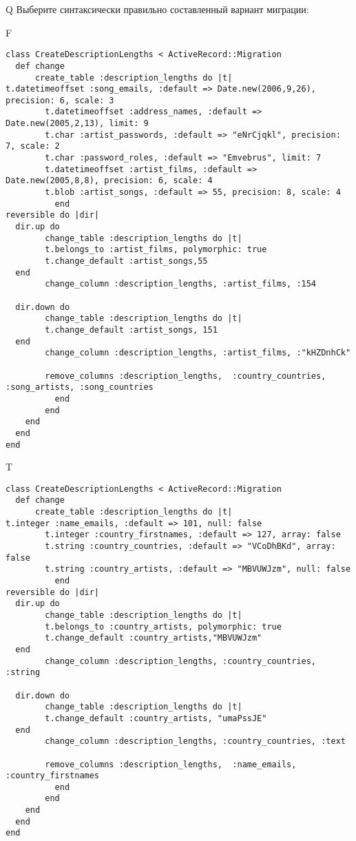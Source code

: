 Q
Выберите синтаксически правильно составленный вариант миграции:

F
\begin{verbatim}
class CreateDescriptionLengths < ActiveRecord::Migration
  def change
	  create_table :description_lengths do |t|
t.datetimeoffset :song_emails, :default => Date.new(2006,9,26), precision: 6, scale: 3
		t.datetimeoffset :address_names, :default => Date.new(2005,2,13), limit: 9
		t.char :artist_passwords, :default => "eNrCjqkl", precision: 7, scale: 2
		t.char :password_roles, :default => "Emvebrus", limit: 7
		t.datetimeoffset :artist_films, :default => Date.new(2005,8,8), precision: 6, scale: 4
		t.blob :artist_songs, :default => 55, precision: 8, scale: 4
		  end
reversible do |dir|
  dir.up do
		change_table :description_lengths do |t|
		t.belongs_to :artist_films, polymorphic: true
 		t.change_default :artist_songs,55
  end
 		change_column :description_lengths, :artist_films, :154
   
  dir.down do
		change_table :description_lengths do |t|
		t.change_default :artist_songs, 151
  end
 		change_column :description_lengths, :artist_films, :"kHZDnhCk"
   
		remove_columns :description_lengths,  :country_countries, :song_artists, :song_countries 
	      end
	    end
    end 
  end
end

\end{verbatim}

T
\begin{verbatim}
class CreateDescriptionLengths < ActiveRecord::Migration
  def change
	  create_table :description_lengths do |t|
t.integer :name_emails, :default => 101, null: false
		t.integer :country_firstnames, :default => 127, array: false
		t.string :country_countries, :default => "VCoDhBKd", array: false
		t.string :country_artists, :default => "MBVUWJzm", null: false
		  end
reversible do |dir|
  dir.up do
		change_table :description_lengths do |t|
		t.belongs_to :country_artists, polymorphic: true
 		t.change_default :country_artists,"MBVUWJzm"
  end
 		change_column :description_lengths, :country_countries, :string
   
  dir.down do
		change_table :description_lengths do |t|
		t.change_default :country_artists, "umaPssJE"
  end
 		change_column :description_lengths, :country_countries, :text
   
		remove_columns :description_lengths,  :name_emails, :country_firstnames 
	      end
	    end
    end 
  end
end

\end{verbatim}

